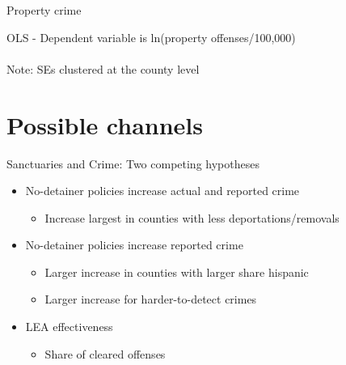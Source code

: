 \documentclass[xcolor=pdftex,dvipsnames,table,handout]{beamer}
\newcommand{\tablesfolder}{/Users/bbiasi/Dropbox/Research/sanctuaries/sanctuaries_git/tex/tables}
\begin{document}
\begin{frame}{Property crime}
\footnotesize
\begin{center}
OLS - Dependent variable is ln(property offenses/100,000)\\

\\\footnotesize{Note: SEs clustered at the county level}
\end{center}
\end{frame}
%
%
\section{Possible channels}
\begin{frame}{Sanctuaries and Crime: Two competing hypotheses}
\pause
\begin{itemize}
\item No-detainer policies increase actual and reported crime\vspace{0.10cm}\pause
\begin{itemize}
\item Increase largest in counties with less deportations/removals
\end{itemize}\vspace{0.30cm}\pause
\item No-detainer policies increase reported crime\vspace{0.10cm}\pause
\begin{itemize}
\item Larger increase in counties with larger share hispanic\vspace{0.10cm}\pause
\item Larger increase for harder-to-detect crimes
\end{itemize}\vspace{0.30cm}\pause
\item LEA effectiveness\vspace{0.10cm}\pause
\begin{itemize}
\item Share of cleared offenses
\end{itemize}
\end{itemize}
\end{frame}
\end{document}
